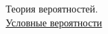 \documentclass[a4paper]{article}
\begin{document}
Теория вероятностей. \\


\underline{Условные вероятности}

\end{document}
